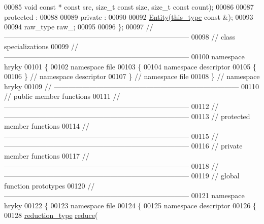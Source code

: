 \begin{DoxyCode}
00085         \textcolor{keywordtype}{void} \textcolor{keyword}{const} * \textcolor{keyword}{const} src, \textcolor{keywordtype}{size\_t} \textcolor{keyword}{const} size, \textcolor{keywordtype}{size\_t} \textcolor{keyword}{const} count);
00086 
00087 \textcolor{keyword}{protected} :
00088 
00089 \textcolor{keyword}{private} :
00090 
00092     \hyperlink{classhryky_1_1file_1_1descriptor_1_1_entity_a43f0da5801f3de07cc722a59ce4f3207}{Entity}(\hyperlink{classhryky_1_1file_1_1descriptor_1_1_entity}{this_type} \textcolor{keyword}{const} &);
00093 
00094     raw\_type raw\_;
00095 
00096 \};
00097 \textcolor{comment}{//
      ------------------------------------------------------------------------------}
00098 \textcolor{comment}{// class specializations}
00099 \textcolor{comment}{//
      ------------------------------------------------------------------------------}
00100 \textcolor{keyword}{namespace }hryky
00101 \{
00102 \textcolor{keyword}{namespace }file
00103 \{
00104 \textcolor{keyword}{namespace }descriptor
00105 \{
00106 \} \textcolor{comment}{// namespace descriptor}
00107 \} \textcolor{comment}{// namespace file}
00108 \} \textcolor{comment}{// namespace hryky}
00109 \textcolor{comment}{//
      ------------------------------------------------------------------------------}
00110 \textcolor{comment}{// public member functions}
00111 \textcolor{comment}{//
      ------------------------------------------------------------------------------}
00112 \textcolor{comment}{//
      ------------------------------------------------------------------------------}
00113 \textcolor{comment}{// protected member functions}
00114 \textcolor{comment}{//
      ------------------------------------------------------------------------------}
00115 \textcolor{comment}{//
      ------------------------------------------------------------------------------}
00116 \textcolor{comment}{// private member functions}
00117 \textcolor{comment}{//
      ------------------------------------------------------------------------------}
00118 \textcolor{comment}{//
      ------------------------------------------------------------------------------}
00119 \textcolor{comment}{// global function prototypes}
00120 \textcolor{comment}{//
      ------------------------------------------------------------------------------}
00121 \textcolor{keyword}{namespace }hryky
00122 \{
00123 \textcolor{keyword}{namespace }file
00124 \{
00125 \textcolor{keyword}{namespace }descriptor
00126 \{
00128     \hyperlink{namespacehryky_a343a9a4c36a586be5c2693156200eadc}{reduction_type} \hyperlink{namespacehryky_af41cb3af6766761da0ff21b84527a52c}{reduce}(

\end{DoxyCode}
